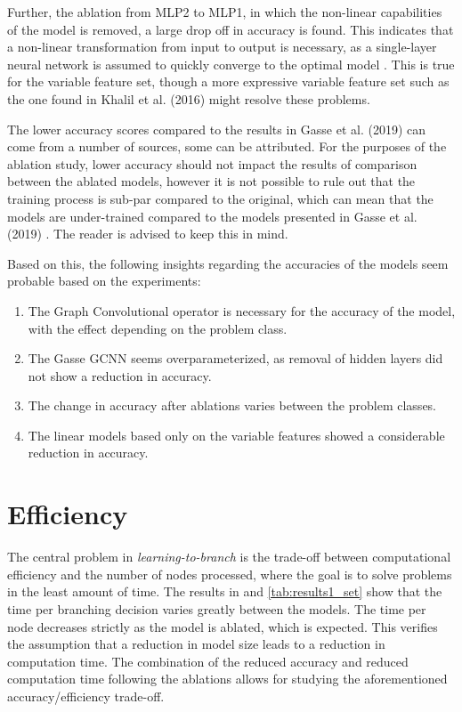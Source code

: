 Further, the ablation from MLP2 to MLP1, in which the non-linear capabilities of the model is removed, a large drop off in accuracy is found. This indicates that a non-linear transformation from input to output is necessary, as a single-layer neural network is assumed to quickly converge to the optimal model \cite{goodfellow2016deep}. This is true for the variable feature set, though a more expressive variable feature set such as the one found in Khalil et al. (2016) \cite{khalil2016learning} might resolve these problems.



The lower accuracy scores compared to the results in Gasse et al. (2019) \cite{gasse2019exact} can come from a number of sources, some can be attributed. For the purposes of the ablation study, lower accuracy should not impact the results of comparison between the ablated models, however it is not possible to rule out that the training process is sub-par compared to the original, which can mean that the models are under-trained compared to the models presented in Gasse et al. (2019) \cite{gasse2019exact}. The reader is advised to keep this in mind. 



Based on this, the following insights regarding the accuracies of the models seem probable based on the experiments:
\begin{enumerate}[label=(\roman*)]
    \item The Graph Convolutional operator is necessary for the accuracy of the model, with the effect depending on the problem class.
    \item The Gasse GCNN seems overparameterized, as removal of hidden layers did not show a reduction in accuracy.
    \item The change in accuracy after ablations varies between the problem classes.
    \item The linear models based only on the variable features showed a considerable reduction in accuracy.
\end{enumerate}


\section{Efficiency}\label{sec:disc_efficiency}



The central problem in \textit{learning-to-branch} is the trade-off between computational efficiency and the number of nodes processed, where the goal is to solve problems in the least amount of time. The results in  and \cref{tab:results1_set} show that the time per branching decision varies greatly between the models. The time per node decreases strictly as the model is ablated, which is expected. This verifies the assumption that a reduction in model size leads to a reduction in computation time. The combination of the reduced accuracy and reduced computation time following the ablations allows for studying the aforementioned accuracy/efficiency trade-off. 

